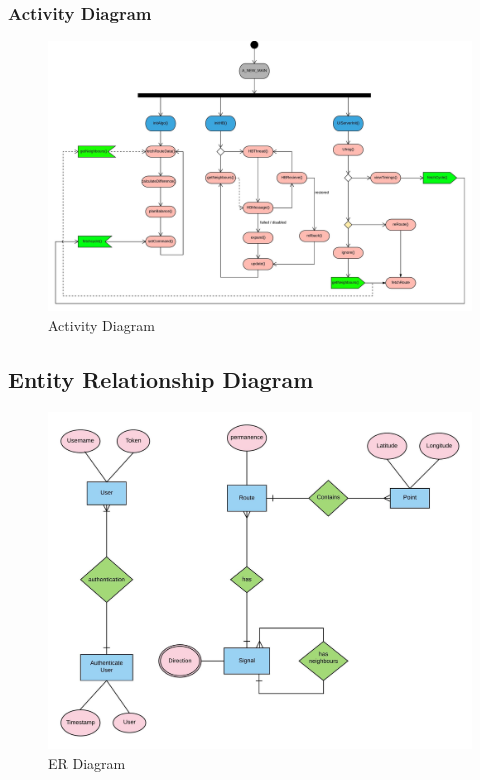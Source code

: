 \documentclass[12pt,a4paper,final]{report}
\begin{document}
\subsubsection{Activity Diagram}
	\begin{figure}[!h]
		\begin{center}
			\includegraphics[scale=0.115]{Diagrams/Activity_Diagram.jpeg}
		\end{center}
		\caption{Activity Diagram}
	\end{figure}
\newpage

\subsection{Entity Relationship Diagram}
	\begin{figure}[!ht]
		\begin{center}
			\includegraphics[scale=0.2]{Diagrams/ER_Diagram.jpeg}
		\end{center}
		\caption{ER Diagram}
	\end{figure}
\end{document}
